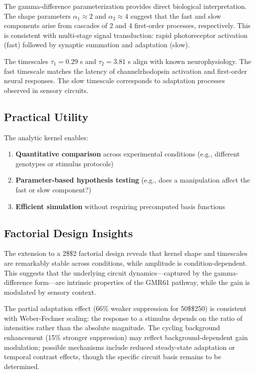 \documentclass[
  11pt,
  letterpaper,
]{article}
\begin{document}
The gamma-difference parameterization provides direct biological
interpretation. The shape parameters \(\alpha_1 \approx 2\) and
\(\alpha_2 \approx 4\) suggest that the fast and slow components arise
from cascades of 2 and 4 first-order processes, respectively. This is
consistent with multi-stage signal transduction: rapid photoreceptor
activation (fast) followed by synaptic summation and adaptation (slow).

The timescales \(\tau_1 = 0.29\) s and \(\tau_2 = 3.81\) s align with
known neurophysiology. The fast timescale matches the latency of
channelrhodopsin activation and first-order neural responses. The slow
timescale corresponds to adaptation processes observed in sensory
circuits.

\subsection{Practical Utility}

The analytic kernel enables:

\begin{enumerate}
    \item \textbf{Quantitative comparison} across experimental conditions (e.g., different genotypes or stimulus protocols)
    \item \textbf{Parameter-based hypothesis testing} (e.g., does a manipulation affect the fast or slow component?)
    \item \textbf{Efficient simulation} without requiring precomputed basis functions
\end{enumerate}

\subsection{Factorial Design Insights}

The extension to a 2\$\times\$2 factorial design reveals that kernel
shape and timescales are remarkably stable across conditions, while
amplitude is condition-dependent. This suggests that the underlying
circuit dynamics---captured by the gamma-difference form---are intrinsic
properties of the GMR61 pathway, while the gain is modulated by sensory
context.

The partial adaptation effect (66\% weaker suppression for
50\$\rightarrow\$250) is consistent with Weber-Fechner scaling: the
response to a stimulus depends on the ratio of intensities rather than
the absolute magnitude. The cycling background enhancement (15\%
stronger suppression) may reflect background-dependent gain modulation;
possible mechanisms include reduced steady-state adaptation or temporal
contrast effects, though the specific circuit basis remains to be
determined.
\end{document}
